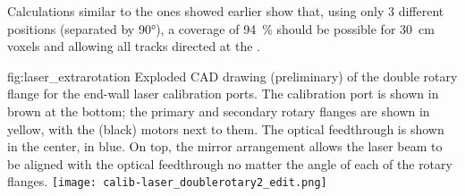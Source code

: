 Calculations similar to the ones showed earlier show that, using only \num{3} different positions (separated by \ang{90}), a coverage of \SI{94}{\%} should be possible for \SI{30}{\cm} voxels and allowing all tracks directed at the .

\begin{dunefigure}{fig:laser_extrarotation}
{Exploded CAD drawing (preliminary) of the double rotary flange for the end-wall laser calibration ports. The calibration port is shown in brown at the bottom; the primary and secondary rotary flanges are shown in yellow,  with the (black) motors next to them. The optical feedthrough is shown in the center, in blue. On top, the mirror arrangement allows the laser beam to be aligned with the optical feedthrough no matter the angle of each of the rotary flanges.}
\texttt{[image: calib-laser\_doublerotary2\_edit.png]}
\end{dunefigure}




